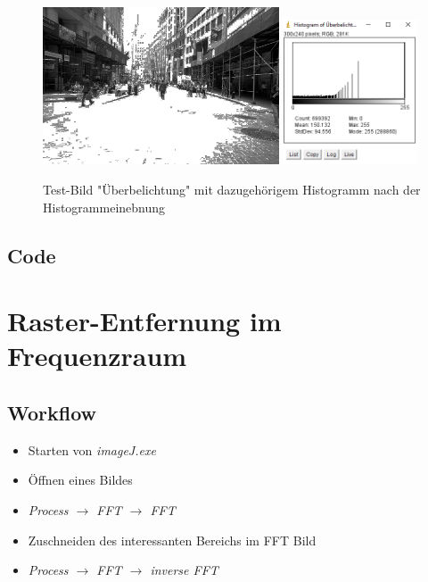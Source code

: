 \documentclass[12pt,german]{article}
\begin{document}
\begin{figure}[h!] \centering
	\includegraphics[width=7cm]{../testData/Results/Ueberbelichtung/Ueberbelichtung-equalized.jpg}
	\includegraphics[width=4cm]{../testData/Results/Ueberbelichtung/Ueberbelichtung-equalized-histogram.png}
	\caption{Test-Bild "Überbelichtung" mit dazugehörigem Histogramm nach der Histogrammeinebnung}
	\label{fig:Ueberbelichtung02}
\end{figure}
\pagebreak
\subsection{Code}




\newpage
\section{ Raster-Entfernung im Frequenzraum}
\subsection{Workflow}
\begin{itemize}
	\item Starten von \textit{imageJ.exe}
	\item Öffnen eines Bildes
	\item \textit{Process $\rightarrow$ FFT $\rightarrow$ FFT}
	\item Zuschneiden des interessanten Bereichs im FFT Bild
	\item \textit{Process $\rightarrow$ FFT $\rightarrow$ inverse FFT}
\end{itemize}
\end{document}
